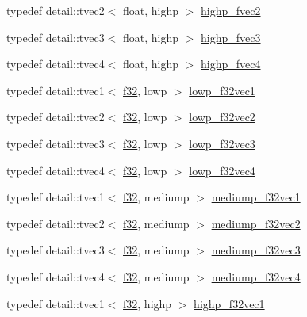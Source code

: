 \begin{CompactItemize}
typedef detail::tvec2$<$ float, highp $>$ \hyperlink{group__gtc__type__precision_gb58ecc53699d45f4f88d67bbff084c54}{highp\_\-fvec2}
\item 
typedef detail::tvec3$<$ float, highp $>$ \hyperlink{group__gtc__type__precision_g79b821fc8ae989b12bb43e2cd3932580}{highp\_\-fvec3}
\item 
typedef detail::tvec4$<$ float, highp $>$ \hyperlink{group__gtc__type__precision_ge0de2413648d89bf5a8e598e5520a439}{highp\_\-fvec4}
\item 
typedef detail::tvec1$<$ \hyperlink{group__gtc__type__precision_g0ec999b57f5330d9021256e96038df04}{f32}, lowp $>$ \hyperlink{group__gtc__type__precision_ge802918ade0497b72c606430830f5ebb}{lowp\_\-f32vec1}
\item 
typedef detail::tvec2$<$ \hyperlink{group__gtc__type__precision_g0ec999b57f5330d9021256e96038df04}{f32}, lowp $>$ \hyperlink{group__gtc__type__precision_g7faa2c9884c87b1e6512a966adad69e4}{lowp\_\-f32vec2}
\item 
typedef detail::tvec3$<$ \hyperlink{group__gtc__type__precision_g0ec999b57f5330d9021256e96038df04}{f32}, lowp $>$ \hyperlink{group__gtc__type__precision_g1f878d91a5f5ab92c756244b62af7248}{lowp\_\-f32vec3}
\item 
typedef detail::tvec4$<$ \hyperlink{group__gtc__type__precision_g0ec999b57f5330d9021256e96038df04}{f32}, lowp $>$ \hyperlink{group__gtc__type__precision_g59f7292d7ed0b7df72e6aa31010e2648}{lowp\_\-f32vec4}
\item 
typedef detail::tvec1$<$ \hyperlink{group__gtc__type__precision_g0ec999b57f5330d9021256e96038df04}{f32}, mediump $>$ \hyperlink{group__gtc__type__precision_gf3d4077b241fbcab529fb0e0d88c0df6}{mediump\_\-f32vec1}
\item 
typedef detail::tvec2$<$ \hyperlink{group__gtc__type__precision_g0ec999b57f5330d9021256e96038df04}{f32}, mediump $>$ \hyperlink{group__gtc__type__precision_gf53d380f948fdbb540eab960f2ad4b58}{mediump\_\-f32vec2}
\item 
typedef detail::tvec3$<$ \hyperlink{group__gtc__type__precision_g0ec999b57f5330d9021256e96038df04}{f32}, mediump $>$ \hyperlink{group__gtc__type__precision_gda8879dd10f28428e2eb1ae62f643f65}{mediump\_\-f32vec3}
\item 
typedef detail::tvec4$<$ \hyperlink{group__gtc__type__precision_g0ec999b57f5330d9021256e96038df04}{f32}, mediump $>$ \hyperlink{group__gtc__type__precision_ga5a1b058d185d87504591a11c6247518}{mediump\_\-f32vec4}
\item 
typedef detail::tvec1$<$ \hyperlink{group__gtc__type__precision_g0ec999b57f5330d9021256e96038df04}{f32}, highp $>$ \hyperlink{group__gtc__type__precision_gc8be8ce31b9df0a5005d7c7458a3d03e}{highp\_\-f32vec1}

\end{CompactItemize}
